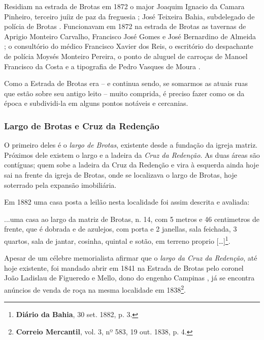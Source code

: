 Residiam na estrada de Brotas em 1872 o major Joaquim Ignacio da Camara Pinheiro, terceiro juíiz de paz da freguesia \cite[segunda~parte, p.~91]{pimenta_almanak_1872}; José Teixeira Bahia, subdelegado de polícia de Brotas \cite[segunda~parte, pp.~132]{pimenta_almanak_1872}. Funcionavam em 1872 na estrada de Brotas as tavernas de Aprigio Monteiro Carvalho, Francisco José Gomes e José Bernardino de Almeida \cite[terceira~parte, pp.~39, 42, 43]{pimenta_almanak_1872}; o consultório do médico Francisco Xavier dos Reis, o escritório do despachante de polícia Moysés Monteiro Pereira, o ponto de aluguel de carroças de Manoel Francisco da Costa e a tipografia de Pedro Vasques de Moura \cite[quarta~parte, pp.~4, 10, 20, 38]{pimenta_almanak_1872}.

Como a Estrada de Brotas era -- e continua sendo, se somarmos as atuais ruas que estão sobre seu antigo leito -- muito comprida, é preciso fazer como os da época e subdividi-la em alguns pontos notáveis e cercanias.

\subsubsection{Largo de Brotas e Cruz da Redenção}\label{subsubsec:brotasredencao}

O primeiro deles é o \textit{largo de Brotas}, existente desde a fundação da igreja matriz. Próximos dele existem o largo e a ladeira da \textit{Cruz da Redenção}. As duas áreas são contíguas; quem sobe a ladeira da Cruz da Redenção e vira à esquerda ainda hoje sai na frente da igreja de Brotas, onde se localizava o largo de Brotas, hoje soterrado pela expansão imobiliária.

Em 1882 uma casa posta a leilão nesta localidade foi assim descrita e avaliada:

\begin{citacao}
...uma casa ao largo da matriz de Brotas, n. 14, com 5 metros e 46 centimetros de frente, que é dobrada e de azulejos, com porta e 2 janellas, sala feichada, 3 quartos, sala de jantar, cosinha, quintal e sotão, em terreno proprio [\dots]\footnote{\textbf{Diário da Bahia}, 30 set. 1882, p. 3.}.
\end{citacao}

Apesar de um célebre memorialista afirmar que o \textit{largo da Cruz da Redenção}, até hoje existente, foi mandado abrir em 1841 na Estrada de Brotas pelo coronel João Ladislau de Figueredo e Mello, dono do engenho Campinas \cite[p.~88]{campos_brotas_1942}, já se encontra anúncios de venda de roça na mesma localidade em 1838\footnote{\textbf{Correio Mercantil}, vol. 3, nº 583, 19 out. 1838, p. 4.}.






